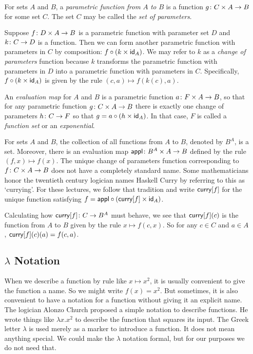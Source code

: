 \begin{defn}
	For sets $A$ and $B$, a \emph{parametric function from $A$ to $B$} is a function ${g}\colon{C\times A}\to{B}$ for some set $C$.
	The set $C$ may be called the \emph{set of parameters}.
	
	Suppose ${f}\colon{D\times A}\to{B}$ is a parametric function with parameter set $D$ and ${k}\colon{C}\to{D}$ is a function.
	Then we can form another parametric function with parameters in $C$ by composition: $f\circ (k\times \textsf{id}_A)$.
	We may refer to $k$ as a \emph{change of parameters} function because $k$ transforms the parametric function with parameters in $D$ into a parametric function with parameters in $C$. 
	Specifically, $f\circ(k\times \textsf{id}_A)$ is given by the rule $(c,a)\mapsto f(k(c),a)$. 
	
	An \emph{evaluation map} for $A$ and $B$ is a parametric function ${a}\colon{F\times A}\to{B}$, so that for any 
	parametric function ${g}\colon{C\times A}\to{B}$ there is exactly one change of parameters ${h}\colon{C}\to{F}$ so that
	$g = a\circ (h\times \textsf{id}_A)$. In that case, $F$ is called a \emph{function set} or an \emph{exponential}.
\end{defn}

\begin{principle}
	For sets $A$ and $B$, the collection of all functions from $A$ to $B$, denoted by $B^A$, is a set.
	Moreover, there is an evaluation map ${\mathord{\textsf{appl}}}\colon{B^A\times A}\to{B}$ defined by the rule $(f,x) \mapsto f(x)$.
	The unique change of parameters function corresponding to ${f}\colon{C\times A}\to{B}$ does not have a completely standard name.
	Some mathematicians honor the twentieth century logician names Haskell Curry by referring to this as `currying'.
	For these lectures, we follow that tradition and write $\mathord{\textsf{curry}}[f]$ for the unique function satisfying $f = \mathord{\textsf{appl}}\circ (\mathord{\textsf{curry}}[f] \times \textsf{id}_A)$.
	
	Calculating how ${\mathord{\textsf{curry}}[f]}\colon{C}\to{B^A}$ must behave, we see that $\mathord{\textsf{curry}}[f](c)$ is the function from $A$ to $B$ given by the rule $x\mapsto f(c,x)$.
	So for any $c\in C$ and $a\in A$, $\mathord{\textsf{curry}}[f](c)(a) = f(c,a)$. 
\end{principle}

\subsection*{$\lambda$ Notation}

When we describe a function by  rule like $x\mapsto x^2$, it is usually convenient to give the function a name.
So we might write $f(x) = x^2$.
But sometimes, it is also convenient to have a notation for a function without giving it an explicit name. 
The logician Alonzo Church \cite{church} proposed a simple notation to describe functions. 
He wrote things like $\lambda x.x^2$ to describe the function that squares its input. 
The Greek letter $\lambda$ is used merely as a marker to introduce a function. 
It does not mean anything special. 
We could make the $\lambda$ notation formal, but for our purposes we do not need that.

